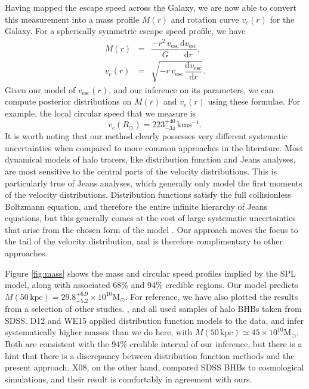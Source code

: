 \documentclass[useAMS,twocolumn,usenatbib]{mn2e}
\def\kpc{{\,\mathrm{kpc}}}
\def\kms{{\,\mathrm{kms^{-1}}}}
\def\vesc{{v_\mathrm{esc}}}
\begin{document}
Having mapped the escape speed across the Galaxy, we are now able to convert this 
measurement into a mass profile $M(r)$ and rotation curve $v_c(r)$ for the Galaxy. For a spherically 
symmetric escape speed profile, we have
%
\begin{eqnarray}
M(r) &=& \dfrac{-r^2\,\vesc}{G}\dfrac{\mathrm{d}\vesc}{\mathrm{d}r}, \label{eq:mass}\\
v_c(r) &=& \sqrt{-r\,\vesc\,\dfrac{\mathrm{d}\vesc}{\mathrm{d}r}}. \label{eq:circspeed}
\end{eqnarray}
%
Given our model of $\vesc(r)$, and our inference on its parameters, we can compute posterior 
distributions on $M(r)$ and $v_c(r)$ using these formulae. For example, the local circular speed 
that we measure is
%
\begin{equation}
v_c(R_\odot) = 223^{+40}_{-34}\kms.
\end{equation}
%
It is worth noting that our method clearly possesses very different
systematic uncertainties when compared to more common approaches in
the literature. Most dynamical models of halo tracers, like
distribution function and Jeans analyses, are most sensitive to the
central parts of the velocity distributions.  This is particularly
true of Jeans analyses, which generally only model the first moments
of the velocity distributions. Distribution functions satisfy the full
collisionless Boltzmann equation, and therefore the entire infinite
hierarchy of Jeans equations, but this generally comes at the cost of
large systematic uncertainties that arise from the chosen form of the
model \citep{Wa15}.  Our approach moves the focus to the tail of the
velocity distribution, and is therefore complimentary to other
approaches.

Figure \ref{fig:mass} shows the mass and circular speed profiles
implied by the SPL model, along with associated 68\% and 94\% credible
regions. Our model predicts $M(50\kpc)=29.8^{+6.9}_{-5.2} \times
10^{10}\mathrm{M}_\odot$. For reference, we have also plotted the
results from a selection of other studies. \citet[][X08]{Xu08},
\citet[][D12]{De12} and \citet[][WE15]{Wi15} all used samples of halo
BHBs taken from SDSS. D12 and WE15 applied distribution function
models to the data, and infer systematically higher masses than we do
here, with $M(50\kpc) \simeq 45\times10^{10}\mathrm{M}_\odot$.  Both
are consistent with the 94\% credible interval of our inference, but
there is a hint that there is a discrepancy between distribution
function methods and the present approach. X08, on the other hand,
compared SDSS BHBs to cosmological simulations, and their result is
comfortably in agreement with ours.
\end{document}
